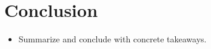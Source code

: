 \section{Conclusion}

\begin{itemize}
  \item Summarize and conclude with concrete takeaways.
\end{itemize}

